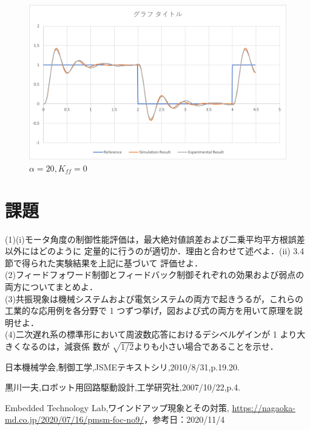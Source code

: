 \documentclass[xelatex,ja=standard,jafont=noto]{bxjsarticle}
\numberwithin{figure}{section}
\begin{document}
\begin{figure}[h!]
    \centering
    \includegraphics[scale=0.6]{020.png}
    \caption{$\alpha=20,K_{ff}=0$}
\end{figure}


    

\newpage


\section{課題}
(1)(i)モータ角度の制御性能評価は，最大絶対値誤差および二乗平均平方根誤差以外にはどのように
定量的に行うのが適切か．理由と合わせて述べよ．(ii) 3.4 節で得られた実験結果を上記に基づいて
評価せよ．\\



(2)フィードフォワード制御とフィードバック制御それぞれの効果および弱点の両方についてまとめよ．\\


(3)共振現象は機械システムおよび電気システムの両方で起きうるが，これらの工業的な応用例を各分野で 1 つずつ挙げ，図および式の両方を用いて原理を説明せよ．\\


(4)二次遅れ系の標準形において周波数応答におけるデシベルゲインが 1 より大きくなるのは，減衰係
数が $\sqrt{1/2}$よりも小さい場合であることを示せ．



\newpage

\begin{thebibliography}{9}
日本機械学会,制御工学,JSMEテキストシリ,2010/8/31,p.19.20. 

黒川一夫,ロボット用回路駆動設計,工学研究社,2007/10/22,p.4. 


Embedded Technology Lab,ワインドアップ現象とその対策,
\url{https://nagaoka-md.co.jp/2020/07/16/pmsm-foc-no9/}，参考日：2020/11/4



\end{thebibliography}
\end{document}
